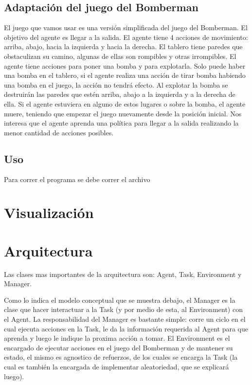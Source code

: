 \documentclass[a4paper,spanish] {article}
\begin{document}
	\subsection{Adaptaci\'on del juego del Bomberman}
	El juego que vamos usar es una versi\'on simplificada del juego del Bomberman. El objetivo del agente es llegar a la salida. El agente tiene 4 acciones de movimiento: arriba, abajo, hacia la izquierda y hacia la derecha. El tablero tiene paredes que obstaculizan su camino, algunas de ellas son rompibles y otras irrompibles. El agente tiene acciones para poner una bomba y para explotarla. Solo puede haber una bomba en el tablero, si el agente realiza una acci\'on de tirar bomba habiendo una bomba en el juego, la acci\'on no tendr\'a efecto. Al explotar la bomba se destruir\'an las paredes que est\'en arriba, abajo a la izquierda y a la derecha de ella. Si el agente estuviera en alguno de estos lugares o sobre la bomba, el agente muere, teniendo que empezar el juego nuevamente desde la posici\'on inicial. Nos interesa que el agente aprenda una pol\'itica para llegar a la salida realizando la menor cantidad de acciones posibles.	
	
	\subsection{Uso}
	Para correr el programa se debe correr el archivo

\section{Visualizaci\'on}
	
\section{Arquitectura}
	
	Las clases mas importantes de la arquitectura son: Agent, Task, Environment y Manager.
	
	Como lo indica el modelo conceptual que se muestra debajo, el Manager es la clase que hacer interactuar a la Task (y por medio de esta, al Environment) con el Agent. La responsabilidad del Manager es bastante simple: corre un ciclo en el cual ejecuta acciones en la Task, le da la informaci\'on requerida al Agent para que aprenda y luego le indique la proxima acci\'on a tomar.
	El Environment es el encargado de ejecutar acciones en el juego del Bomberman y de mantener su estado, el mismo es agnostico de refuerzos, de los cuales se encarga la Task (la cual es tambi\'en la encargada de implementar aleatoriedad, que se explicar\'a luego).
	
\end{document}
